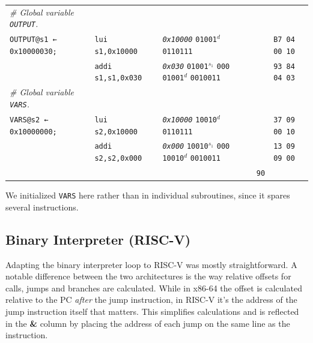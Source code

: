 \documentclass[a4paper,12pt,final]{article}
\begin{document}
\begin{table}[!htbp]
\begin{adjustwidth}{-1cm}{-1cm}
\begin{center}
\begin{tabular}{l|ll|l|l}
\emph{\# Global variable \texttt{OUTPUT}.} &  &  &  & \\[0pt]
\texttt{OUTPUT@s1 ← 0x10000030;} & \texttt{lui s1,0x10000} & \emph{\texttt{0x10000}}                                 \texttt{01001}​\(^{d}\)   \texttt{0110111} &  & \texttt{B7 04 00 10}\\[0pt]
 & \texttt{addi s1,s1,0x030} & \emph{\texttt{0x030}}   \texttt{01001}​\(^{s_{1}}\) \texttt{000} \texttt{01001}​\(^{d}\)   \texttt{0010011} &  & \texttt{93 84 04 03}\\[0pt]
\emph{\# Global variable \texttt{VARS}.} &  &  &  & \\[0pt]
\texttt{VARS@s2 ← 0x10000000;} & \texttt{lui s2,0x10000} & \emph{\texttt{0x10000}}                                 \texttt{10010}​\(^{d}\)   \texttt{0110111} &  & \texttt{37 09 00 10}\\[0pt]
 & \texttt{addi s2,s2,0x000} & \emph{\texttt{0x000}}   \texttt{10010}​\(^{s_{1}}\) \texttt{000} \texttt{10010}​\(^{d}\)   \texttt{0010011} &  & \texttt{13 09 09 00}\\[0pt]
 &  &  & \texttt{90} & \\[0pt]
\end{tabular}

\end{center}
\normalsize \end{adjustwidth} \end{table} \vspace{0}

We initialized \texttt{VARS} here rather than in individual subroutines,
since it spares several instructions.
\clearpage


\subsection{Binary Interpreter (RISC-V)}
\label{sec:org9082b48}

Adapting the binary interpreter loop to RISC-V was mostly
straightforward.  A notable difference between the two architectures
is the way relative offsets for calls, jumps and branches are
calculated.  While in x86-64 the offset is calculated relative to the
PC \emph{after} the jump instruction, in RISC-V it's the address of the
jump instruction itself that matters.  This simplifies calculations
and is reflected in the \textbf{\&} column by placing the address of each jump
on the same line as the instruction.
\end{document}
